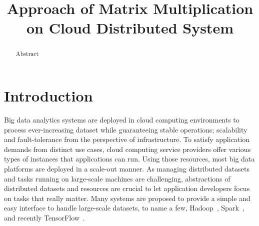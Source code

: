 \documentclass[10pt, conference, compsocconf]{IEEEtran}
\begin{document}

\title{Approach of Matrix Multiplication on Cloud Distributed System}


\author{
\and
{}
}

\maketitle

\begin{abstract}
Abstract
\end{abstract}

\IEEEpeerreviewmaketitle

\section{Introduction}\label{sec:intro}
Big data analytics systems are deployed in cloud computing environments to process ever-increasing dataset while guaranteeing stable operations; scalability and fault-tolerance from the perspective of infrastructure. To satisfy application demands from distinct use cases, cloud computing service providers offer various types of instances that applications can run. Using those resources, most big data platforms are deployed in a scale-out manner. As managing distributed datasets and tasks running on large-scale machines are challenging, abstractions of distributed datasets and resources are crucial to let application developers focus on tasks that really matter. Many systems are proposed to provide a simple and easy interface to handle large-scale datasets, to name a few, Hadoop~\cite{hadoop}, Spark~\cite{spark}, and recently TensorFlow~\cite{tensorflow}.
\end{document}

